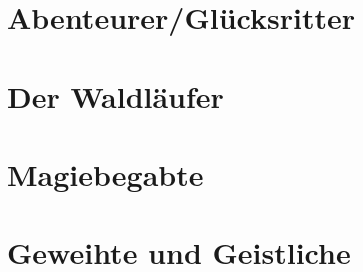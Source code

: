\newpage
\section{Abenteurer/Glücksritter}

\newpage

\newpage


\newpage
\section{Der Waldläufer}

\newpage


\newpage
\section{Magiebegabte}

\newpage

\newpage

\newpage

\newpage

\newpage

\newpage


\newpage
\section{Geweihte und Geistliche}

\newpage

\newpage
